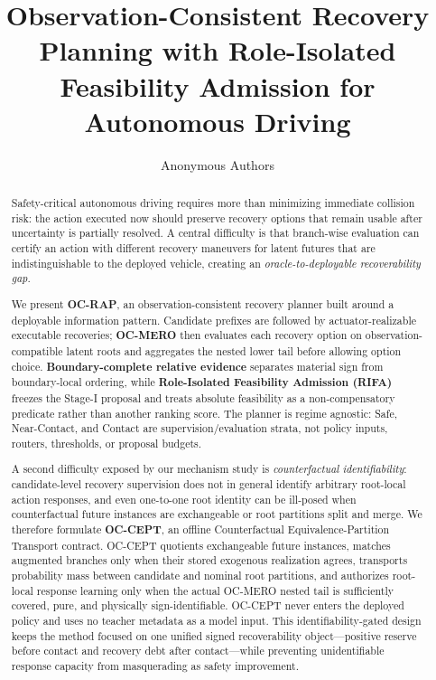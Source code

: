 \documentclass[conference]{IEEEtran}
\title{Observation-Consistent Recovery Planning with Role-Isolated Feasibility Admission for Autonomous Driving}
\author{Anonymous Authors}
\begin{document}
\maketitle


\begin{abstract}
Safety-critical autonomous driving requires more than minimizing immediate collision risk: the action executed now should preserve recovery options that remain usable after uncertainty is partially resolved. A central difficulty is that branch-wise evaluation can certify an action with different recovery maneuvers for latent futures that are indistinguishable to the deployed vehicle, creating an \emph{oracle-to-deployable recoverability gap}.

We present \textbf{OC-RAP}, an observation-consistent recovery planner built around a deployable information pattern. Candidate prefixes are followed by actuator-realizable executable recoveries; \textbf{OC-MERO} then evaluates each recovery option on observation-compatible latent roots and aggregates the nested lower tail before allowing option choice. \textbf{Boundary-complete relative evidence} separates material sign from boundary-local ordering, while \textbf{Role-Isolated Feasibility Admission (RIFA)} freezes the Stage-I proposal and treats absolute feasibility as a non-compensatory predicate rather than another ranking score. The planner is regime agnostic: Safe, Near-Contact, and Contact are supervision/evaluation strata, not policy inputs, routers, thresholds, or proposal budgets.

A second difficulty exposed by our mechanism study is \emph{counterfactual identifiability}: candidate-level recovery supervision does not in general identify arbitrary root-local action responses, and even one-to-one root identity can be ill-posed when counterfactual future instances are exchangeable or root partitions split and merge. We therefore formulate \textbf{OC-CEPT}, an offline Counterfactual Equivalence-Partition Transport contract. OC-CEPT quotients exchangeable future instances, matches augmented branches only when their stored exogenous realization agrees, transports probability mass between candidate and nominal root partitions, and authorizes root-local response learning only when the actual OC-MERO nested tail is sufficiently covered, pure, and physically sign-identifiable. OC-CEPT never enters the deployed policy and uses no teacher metadata as a model input. This identifiability-gated design keeps the method focused on one unified signed recoverability object---positive reserve before contact and recovery debt after contact---while preventing unidentifiable response capacity from masquerading as safety improvement.
\end{abstract}
\end{document}
